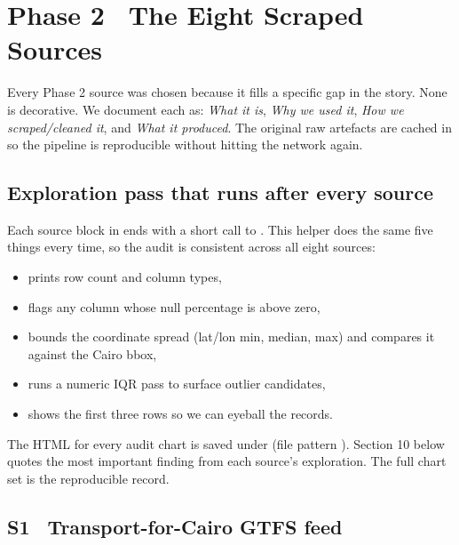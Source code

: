 
\section{Phase 2 \textbullet\ The Eight Scraped Sources}
\label{sec:phase2-sources}

Every Phase 2 source was chosen because it fills a specific gap in the
story. None is decorative. We document each as: \emph{What it is},
\emph{Why we used it}, \emph{How we scraped/cleaned it}, and
\emph{What it produced}. The original raw artefacts are cached in
 so the pipeline is reproducible without hitting
the network again.

\subsection*{Exploration pass that runs after every source}

Each source block in  ends with a
short call to . This helper does the same five things every time, so
the audit is consistent across all eight sources:

\begin{itemize}
  \item prints row count and column types,
  \item flags any column whose null percentage is above zero,
  \item bounds the coordinate spread (lat/lon min, median, max) and
        compares it against the Cairo bbox,
  \item runs a numeric IQR pass to surface outlier candidates,
  \item shows the first three rows so we can eyeball the records.
\end{itemize}

The HTML for every audit chart is saved under
 (file pattern
). Section 10 below quotes the most
important finding from each source's exploration. The full chart set
is the reproducible record.

\subsection{S1 \textbullet\ Transport-for-Cairo GTFS feed}

